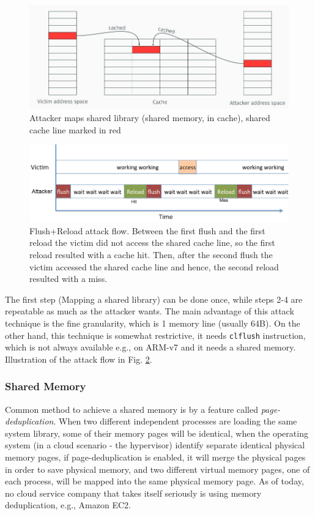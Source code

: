 \begin{figure}[h]
    \centering
    \includegraphics[width=\textwidth]{images/fr_sharedlib.JPG}
    \caption{Attacker maps shared library (shared memory, in cache), shared cache line marked in red}
    \label{fig:fr_sharedlib}
\end{figure}

\begin{figure}[h]
    \centering
    \includegraphics[width=\textwidth]{images/fr_flow.png}
    \caption{Flush+Reload attack flow. Between the first flush and the first reload the victim did not access the shared cache line, so the first reload resulted with a cache hit. Then, after the second flush the victim accessed the shared cache line and hence, the second reload resulted with a miss.}
    \label{fig:fr_flow}
\end{figure}

\noindent The first step (Mapping a shared library) can be done once, while steps 2-4 are repeatable as much as the attacker wants. The main advantage of this attack technique is the fine granularity, which is 1 memory line (usually 64B). On the other hand, this technique is somewhat restrictive, it needs \texttt{clflush} instruction, which is not always available e.g., on ARM-v7 and it needs a shared memory. Illustration of the attack flow in Fig. \ref{fig:fr_flow}.

\subsubsection{Shared Memory}
Common method to achieve a shared memory is by a feature called \textit{page-deduplication}. When two different independent processes are loading the same system library, some of their memory pages will be identical, when the operating system (in a cloud scenario - the hypervisor) identify separate identical physical memory pages, if page-deduplication is enabled, it will merge the physical pages in order to save physical memory, and two different virtual memory pages, one of each process, will be mapped into the same physical memory page. As of today, no cloud service company that takes itself seriously is using memory deduplication, e.g., Amazon EC2.

